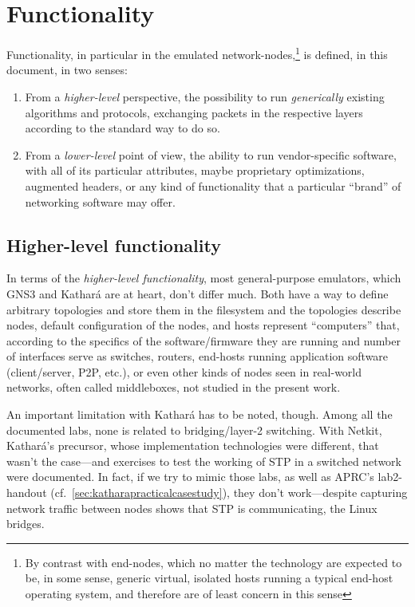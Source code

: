 \section{Functionality}
\label{sec:comparativefunctionality}

Functionality, in particular in the emulated network-nodes,\footnote{By contrast with end-nodes, which no matter the technology are expected to be, in some sense, generic virtual, isolated hosts running a typical end-host operating system, and therefore are of least concern in this sense} is defined, in this document, in two senses:
\begin{enumerate}
  \item From a \emph{higher-level} perspective, the possibility to run \emph{generically} existing algorithms and protocols, exchanging packets in the respective layers according to the standard way to do so.
  \item From a \emph{lower-level} point of view, the ability to run vendor-specific software, with all of its particular attributes, maybe proprietary optimizations, augmented headers, or any kind of functionality that a particular ``brand'' of networking software may offer.
\end{enumerate}

\subsection{Higher-level functionality}

In terms of the \emph{higher-level functionality}, most general-purpose emulators, which GNS3 and Kathará are at heart, don't differ much.
Both have a way to define arbitrary topologies and store them in the filesystem and the topologies describe nodes, default configuration of the nodes, and hosts represent ``computers'' that, according to the specifics of the software/firmware they are running and number of interfaces serve as switches, routers, end-hosts running application software (client/server, P2P, etc.), or even other kinds of nodes seen in real-world networks, often called middleboxes, not studied in the present work.

An important limitation with Kathará has to be noted, though.
Among all the documented labs, none is related to bridging/layer-2 switching.
With Netkit, Kathará's precursor, whose implementation technologies were different, that wasn't the case---and exercises to test the working of STP in a switched network were documented.
In fact, if we try to mimic those labs, as well as APRC's lab2-handout (cf.~\ref{sec:katharapracticalcasestudy}), they don't work---despite capturing network traffic between nodes shows that STP is communicating, the Linux bridges.

